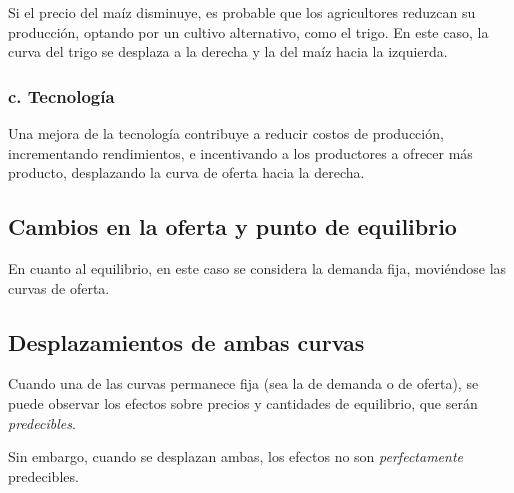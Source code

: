 Si el precio del maíz disminuye,
es probable que los agricultores reduzcan su producción,
optando por un cultivo alternativo, como el trigo.
En este caso, 
la curva del trigo se desplaza a la derecha y la del maíz hacia la izquierda.

\subsubsection{c. Tecnología}

Una mejora de la tecnología contribuye a reducir costos de producción,
incrementando rendimientos,
e incentivando a los productores a ofrecer más producto,
desplazando la curva de oferta hacia la derecha.

\subsection{Cambios en la oferta y punto de equilibrio}

En cuanto al equilibrio, 
en este caso se considera la demanda fija,
moviéndose las curvas de oferta.

\subsection{Desplazamientos de ambas curvas}

Cuando una de las curvas permanece fija
(sea la de demanda o de oferta),
se puede observar los efectos sobre precios y cantidades de equilibrio,
que serán \textit{predecibles}.

Sin embargo,
cuando se desplazan ambas,
los efectos no son \textit{perfectamente} predecibles.
